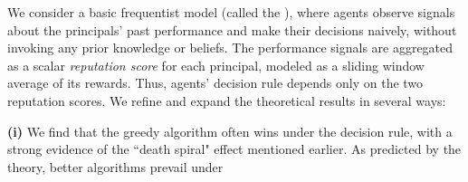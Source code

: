 

We consider a basic frequentist model (called the \emph{\ExptsModel}), where agents observe signals about the principals' past performance and
make their decisions naively,
without invoking any prior knowledge or beliefs. The performance signals are aggregated as a scalar \emph{reputation score} for each principal, modeled as a sliding window average of its rewards. Thus, agents' decision rule depends only on the two reputation scores.
We refine and expand the theoretical results in several ways:

\textbf{(i)}
We find that the greedy algorithm often wins under the \HardMax decision rule, with a strong evidence of the ``death spiral" effect mentioned earlier. As predicted by the theory, better algorithms prevail under \HardMaxRandom
{}

